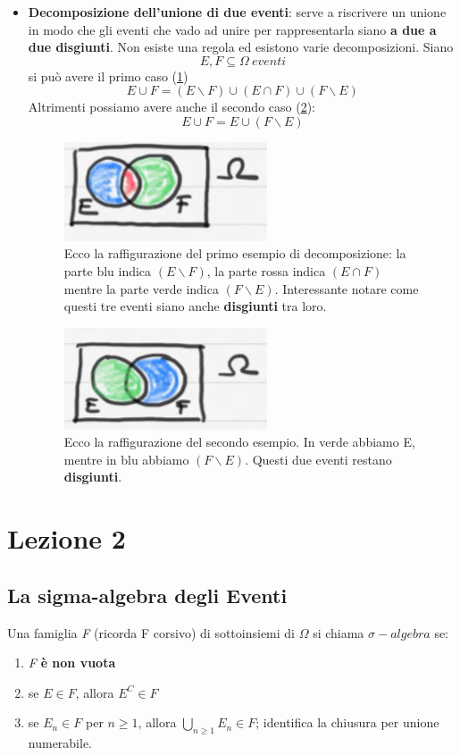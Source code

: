 \documentclass{report}
\begin{document}
\begin{itemize}
\item \textbf{Decomposizione dell'unione di due eventi}: serve a riscrivere un unione in modo che gli eventi che vado ad unire per rappresentarla siano \textbf{a due a due disgiunti}. Non esiste una regola ed esistono varie decomposizioni. Siano \[E,F \subseteq \Omega\ eventi\] si può avere il primo caso (\ref{fig:DecomposizioneC1})\[E \cup F = (E \backslash F)\cup (E \cap F)\cup (F\backslash E)\]
Altrimenti possiamo avere anche il secondo caso (\ref{fig:DecomposizioneC2}): \[E \cup F = E \cup (F \backslash E)\]
\begin{figure}
    \centering
    \includegraphics[width = 6cm]{DecomposizioneC.png}
    \caption{Ecco la raffigurazione del primo esempio di decomposizione: la parte blu indica \((E\backslash F)\), la parte rossa indica \((E \cap F)\) mentre la parte verde indica \((F\backslash E)\). Interessante notare come questi tre eventi siano anche \textbf{disgiunti} tra loro.}
    \label{fig:DecomposizioneC1}
\end{figure}
\begin{figure}
    \centering
    \includegraphics[width = 6cm]{DecomposizioneC2.png}
    \caption{Ecco la raffigurazione del secondo esempio. In verde abbiamo E, mentre in blu abbiamo \((F \backslash E)\). Questi due eventi restano \textbf{disgiunti}.}
    \label{fig:DecomposizioneC2}
\end{figure}
\end{itemize}

\chapter{Lezione 2}
\section{La sigma-algebra degli Eventi}
Una famiglia \textit{F} (ricorda F corsivo) di sottoinsiemi di \(\Omega\) si chiama \(\sigma-algebra\) se: \begin{enumerate}
    \item \textit{F} \textbf{è non vuota}
    \item se \(E \in \textit{F}\), allora \(E^C \in F\)
    \item se \(E_n \in \textit{F}\) per \(n \geq 1\), allora \(\bigcup_{n \geq 1} E_n \in F\); identifica la chiusura per unione numerabile.
\end{enumerate}
\end{document}
